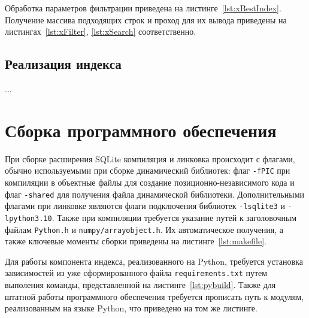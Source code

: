{
\captionsetup{format=hang,justification=raggedright,
              singlelinecheck=off,width=16cm}
}

Обработка параметров фильтрации приведена на листинге~\ref{lst:xBestIndex}.
Получение массива подходящих строк и проход для их вывода приведены на
листингах~\ref{lst:xFilter}, \ref{lst:xSearch} соответственно.

{
\captionsetup{format=hang,justification=raggedright,
              singlelinecheck=off,width=16cm}
}

{
\captionsetup{format=hang,justification=raggedright,
              singlelinecheck=off,width=16cm}
}

{
\captionsetup{format=hang,justification=raggedright,
              singlelinecheck=off,width=16cm}
}

\subsection{Реализация индекса}

...

\section{Сборка программного обеспечения}

При сборке расширения SQLite компиляция и линковка происходит с флагами,
обычно используемыми при сборке динамический библиотек: флаг \texttt{-fPIC} при
компиляции в объектные файлы для создание позиционно-независимого кода и флаг
\texttt{-shared} для получения файла динамической библиотеки. Дополнительными
флагами при линковке являются флаги подключения библиотек \texttt{-lsqlite3} и
\texttt{-lpython3.10}. Также при компиляции требуется указание путей к
заголовочным файлам \texttt{Python.h} и \texttt{numpy/arrayobject.h}. Их
автоматическое получения, а также ключевые моменты сборки приведены на
листинге~\ref{lst:makefile}.

{
\captionsetup{format=hang,justification=raggedright,
              singlelinecheck=off,width=16cm}
}

Для работы компонента индекса, реализованного на Python, требуется установка
зависимостей из уже сформированного файла \texttt{requirements.txt} путем
выполения команды, представленной на листинге~\ref{lst:pybuild}. Также для
штатной работы программного обеспечения требуется прописать путь к модулям,
реализованным на языке Python, что приведено на том же листинге.


